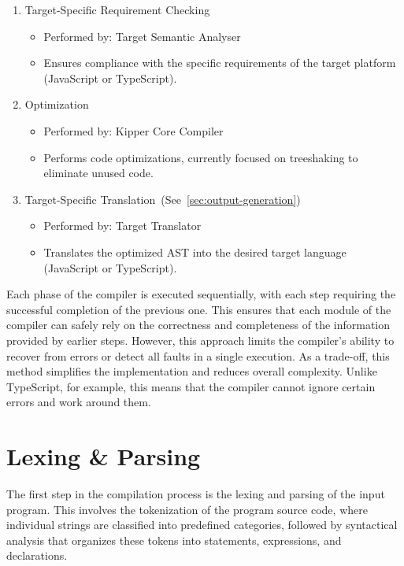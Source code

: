 \begin{enumerate}
	\item Target-Specific Requirement Checking
	\begin{itemize}
		\item Performed by: Target Semantic Analyser
		\item Ensures compliance with the specific requirements of the target platform (JavaScript or TypeScript).
	\end{itemize}
	\item Optimization
	\begin{itemize}
		\item Performed by: Kipper Core Compiler
		\item Performs code optimizations, currently focused on treeshaking to eliminate unused code.
	\end{itemize}
	\item Target-Specific Translation~(See~\ref{sec:output-generation})
	\begin{itemize}
		\item Performed by: Target Translator
		\item Translates the optimized AST into the desired target language (JavaScript or TypeScript).
	\end{itemize}
\end{enumerate}

Each phase of the compiler is executed sequentially, with each step requiring the successful completion of the previous one. This ensures that each module of the compiler can safely rely on the correctness and completeness of the information provided by earlier steps. However, this approach limits the compiler's ability to recover from errors or detect all faults in a single execution. As a trade-off, this method simplifies the implementation and reduces overall complexity. Unlike TypeScript, for example, this means that the compiler cannot ignore certain errors and work around them. 

\section{Lexing \& Parsing}
\label{sec:lexing-parsing}

The first step in the compilation process is the lexing and parsing of the input program. This involves the tokenization of the program source code, where individual strings are classified into predefined categories, followed by syntactical analysis that organizes these tokens into statements, expressions, and declarations.

